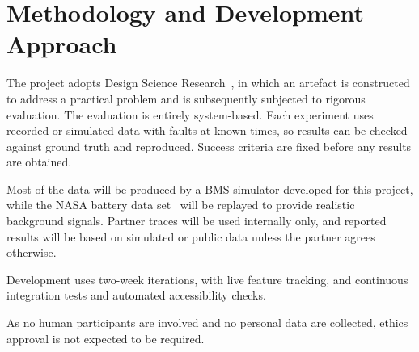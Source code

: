 \section{Methodology and Development Approach}
\label{sec:methodology}

The project adopts Design Science Research~\cite{hevner2004design}, in which an artefact is constructed to address a practical problem and is subsequently subjected to rigorous evaluation.
The evaluation is entirely system-based.
Each experiment uses recorded or simulated data with faults at known times, so results can be checked against ground truth and reproduced.
Success criteria are fixed before any results are obtained.

Most of the data will be produced by a BMS simulator developed for this project, while the NASA battery data set~\cite{saha2007battery} will be replayed to provide realistic background signals.
Partner traces will be used internally only, and reported results will be based on simulated or public data unless the partner agrees otherwise.

Development uses two-week iterations, with live feature tracking, and continuous integration tests and automated accessibility checks.

As no human participants are involved and no personal data are collected, ethics approval is not expected to be required.
